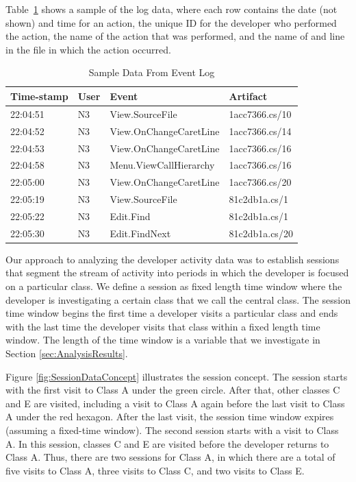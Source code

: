 Table~\ref{fig:SampleEventData} shows a sample of the log data, where each row contains the date (not shown) and time for an action, the unique ID for the developer who performed the action, the name of the action that was performed, and the name of and line in the file in which the action occurred.

\begin{table}[!t]
    \renewcommand{\arraystretch}{1.3}
    \centering
    \caption{Sample Data From Event Log}
    \begin{tabular}{llll}
        \toprule
        \textbf{Time-stamp} & \textbf{User} & \textbf{Event} & \textbf{Artifact} \\
        \midrule
        22:04:51 & N3 & View.SourceFile & 1acc7366.cs/10 \\
        22:04:52 & N3 & View.OnChangeCaretLine & 1acc7366.cs/14 \\
        22:04:53 & N3 & View.OnChangeCaretLine & 1acc7366.cs/16 \\
        22:04:58 & N3 & Menu.ViewCallHierarchy & 1acc7366.cs/16 \\
        22:05:00 & N3 & View.OnChangeCaretLine & 1acc7366.cs/20 \\
        22:05:19 & N3 & View.SourceFile & 81c2db1a.cs/1 \\
        22:05:22 & N3 & Edit.Find & 81c2db1a.cs/1 \\
        22:05:30 & N3 & Edit.FindNext & 81c2db1a.cs/20 \\
        \bottomrule
    \end{tabular}
    \label{fig:SampleEventData}
\end{table}

Our approach to analyzing the developer activity data was to establish sessions that segment the stream of activity into periods in which the developer is focused on a particular class. We define a session as fixed length time window where the developer is investigating a certain class that we call the central class.  The session time window begins the first time a developer visits a particular class and ends with the last time the developer visits that class within a fixed length time window. The length of the time window is a variable that we investigate in Section \ref{sec:AnalysisResults}.  

Figure \ref{fig:SessionDataConcept} illustrates the session concept.  The session starts with the first visit to Class A under the green circle.  After that, other classes C and E are visited, including a visit to Class A again before the last visit to Class A under the red hexagon.  After the last visit, the session time window expires (assuming a fixed-time window).  The second session starts with a visit to Class A.  In this session, classes C and E are visited before the developer returns to Class A.  Thus, there are two sessions for Class A, in which there are a total of five visits to Class A, three visits to Class C, and two visits to Class E.

